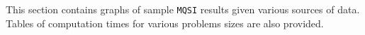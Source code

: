 
This section contains graphs of sample {\tt MQSI} results given
various sources of data. Tables of computation times for various
problems sizes are also provided.
